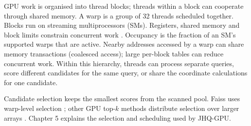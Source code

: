 GPU work is organised into thread blocks; threads within a block can
cooperate through shared memory. A warp is a group of 32 threads scheduled
together. Blocks run on streaming multiprocessors (SMs). Registers, shared memory
and block limits constrain concurrent work \cite{cuda_programming_guide}.
Occupancy is the fraction of an SM's supported warps that are active.
Nearby addresses accessed by a warp can share memory transactions
(coalesced access); large per-block tables can reduce concurrent work.
Within this hierarchy, threads can process separate queries, score
different candidates for the same query, or share the coordinate
calculations for one candidate.

Candidate selection keeps the smallest scores from the scanned pool.
Faiss uses warp-level selection \cite{johnson_gpu}; other GPU top-$k$
methods distribute selection over larger arrays \cite{gpu_topk}.
Chapter 5 explains the selection and scheduling used by JHQ-GPU.
